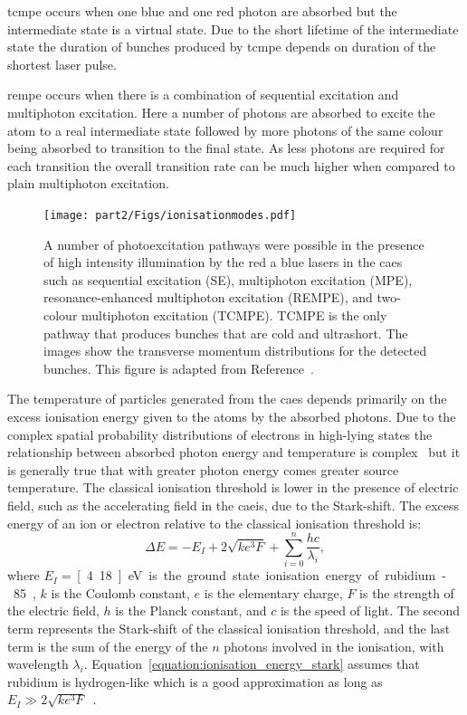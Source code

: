 \Gls{tcmpe} occurs when one blue and one red photon are absorbed but the intermediate state is a virtual state.
Due to the short lifetime of the intermediate state the duration of bunches produced by \gls{tcmpe} depends on duration of the shortest laser pulse.

\Gls{rempe} occurs when there is a combination of sequential excitation and multiphoton excitation.
Here a number of photons are absorbed to excite the atom to a real intermediate state followed by more photons of the same colour being absorbed to transition to the final state.
As less photons are required for each transition the overall transition rate can be much higher when compared to plain multiphoton excitation.

\begin{figure}
    \center
    \texttt{[image: part2/Figs/ionisationmodes.pdf]}
    \caption[Photoexcitation pathways.]{A number of photoexcitation pathways were possible in the presence of high intensity illumination by the red a blue lasers in the \gls{caes} such as sequential excitation (SE), multiphoton excitation (MPE), resonance-enhanced multiphoton excitation (REMPE), and two-colour multiphoton excitation (TCMPE). TCMPE is the only pathway that produces bunches that are cold and ultrashort. The images show the transverse momentum distributions for the detected bunches.
    This figure is adapted from Reference~\cite{speirs_electron_2017}.}
    \label{figure:ionisation_modes}
\end{figure}

The temperature of particles generated from the \gls{caes} depends primarily on the excess ionisation energy given to the atoms by the absorbed photons.
Due to the complex spatial probability distributions of electrons in high-lying states the relationship between absorbed photon energy and temperature is complex~\cite{mcculloch_high-coherence_2013} but it is generally true that with greater photon energy comes greater source temperature.
The classical ionisation threshold is lower in the presence of electric field, such as the accelerating field in the \gls{caeis}, due to the Stark-shift.
The excess energy of an ion or electron relative to the classical ionisation threshold is:
\begin{equation}\label{equation:ionisation_energy_stark}
\Delta E = -E_I + 2\sqrt{ke^3F} + \sum_{i=0}^{n}{\frac{hc}{\lambda_i}},
\end{equation}
where $E_I=$\,\unit[4.18]{eV} is the ground state ionisation energy of rubidium-85, $k$ is the Coulomb constant, $e$ is the elementary charge, $F$ is the strength of the electric field, $h$ is the Planck constant, and $c$ is the speed of light.
The second term represents the Stark-shift of the classical ionisation threshold, and the last term is the sum of the energy of the $n$ photons involved in the ionisation, with wavelength $\lambda_i$.
Equation~\ref{equation:ionisation_energy_stark} assumes that rubidium is hydrogen-like which is a good approximation as long as $E_I \gg 2\sqrt{ke^3F}$~\cite{gallagher_rydberg_2005}.

